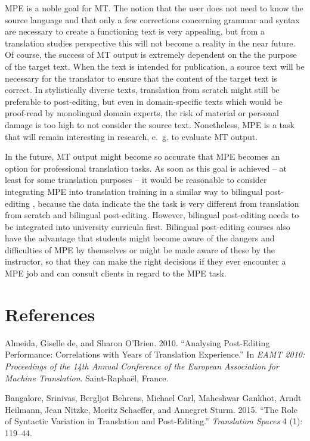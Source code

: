 \documentclass[output=paper]{langsci/langscibook}
\begin{document}
MPE is a noble goal for MT. The notion that the user does not need to know the source language and that only a few corrections concerning grammar and syntax are necessary to create a functioning text is very appealing, but from a translation studies perspective this will not become a reality in the near future. Of course, the success of MT output is extremely dependent on the the purpose of the target text. When the text is intended for publication, a source text will be necessary for the translator to ensure that the content of the target text is correct. In stylistically diverse texts, translation from scratch might still be preferable to post-editing, but even in domain-specific texts which would be proof-read by monolingual domain experts, the risk of material or personal damage is too high to not consider the source text. Nonetheless, MPE is a task that will remain interesting in research, e.~g. to evaluate MT output.



In the future, MT output might become so accurate that MPE becomes an option for professional translation tasks. As soon as this goal is achieved – at least for some translation purposes – it would be reasonable to consider integrating MPE into translation training in a similar way to bilingual post-editing \citep{obrien2002}, because the data indicate the the task is very different from translation from scratch and bilingual post-editing. However, bilingual post-editing needs to be integrated into university curricula first. Bilingual post-editing courses also have the advantage that students might become aware of the dangers and difficulties of MPE by themselves or might be made aware of these by the instructor, so that they can make the right decisions if they ever encounter a MPE job and can consult clients in regard to the MPE task.


\section[References]{References}

Almeida, Giselle de, and Sharon O’Brien. 2010. “Analysing Post-Editing Performance: Correlations with Years of Translation Experience.” In \textit{EAMT 2010: Proceedings of the 14th Annual Conference of the European Association for Machine Translation}. Saint-Raphaël, France.



Bangalore, Srinivas, Bergljot Behrens, Michael Carl, Maheshwar Gankhot, Arndt Heilmann, Jean Nitzke, Moritz Schaeffer, and Annegret Sturm. 2015. “The Role of Syntactic Variation in Translation and Post-Editing.” \textit{Translation Spaces} 4 (1): 119–44.
\end{document}
